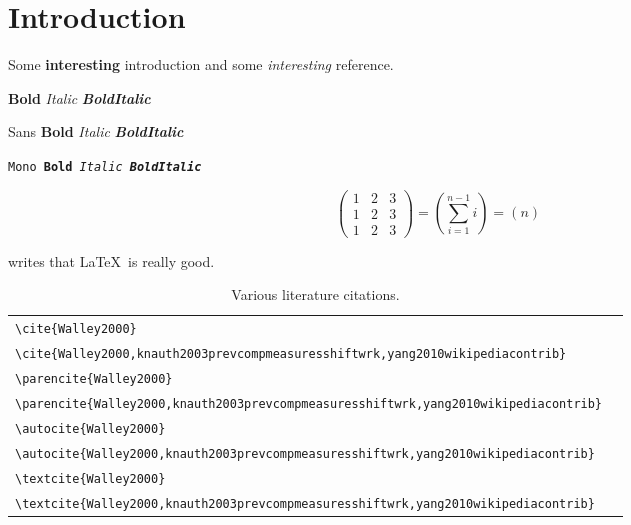 \chapter{Introduction}
\label{chap_introduction}

Some \textbf{interesting} \textsf{introduction} and some \emph{interesting} reference.
\par\textbf{Bold} \textit{Italic} \textbf{\textit{BoldItalic}}
\par\textsf{Sans \textbf{Bold} \textit{Italic} \textbf{\textit{BoldItalic}}}
\par\texttt{Mono \textbf{Bold} \textit{Italic} \textbf{\textit{BoldItalic}}}

\begin{equation*}
    \begin{pmatrix}
      1 & 2 & 3  \\
      1 & 2 & 3  \\
      1 & 2 & 3
    \end{pmatrix}
    = \left( \sum_{i=1}^{n-1} i \right)
    = \left( n \right)
\end{equation*}

\textcite{Walley2000} writes that \LaTeX\ is really good.

\begin{table}
\begin{tabular}{L{.6\linewidth}L{.3\linewidth}}%
\toprule%
\lstinline|\cite{Walley2000}| & \cite{Walley2000} \\[0.5em]%
\lstinline|\cite{Walley2000,knauth2003prevcompmeasuresshiftwrk,yang2010wikipediacontrib}| & \cite{Walley2000,knauth2003prevcompmeasuresshiftwrk,yang2010wikipediacontrib} \\
\midrule%
\lstinline|\parencite{Walley2000}| & \parencite{Walley2000} \\[0.5em]%
\lstinline|\parencite{Walley2000,knauth2003prevcompmeasuresshiftwrk,yang2010wikipediacontrib}| & \parencite{Walley2000,knauth2003prevcompmeasuresshiftwrk,yang2010wikipediacontrib} \\
\midrule%
\lstinline|\autocite{Walley2000}| & \autocite{Walley2000} \\[0.5em]%
\lstinline|\autocite{Walley2000,knauth2003prevcompmeasuresshiftwrk,yang2010wikipediacontrib}| & \autocite{Walley2000,knauth2003prevcompmeasuresshiftwrk,yang2010wikipediacontrib} \\
\midrule%
\lstinline|\textcite{Walley2000}| & \textcite{Walley2000} \\[0.5em]%
\lstinline|\textcite{Walley2000,knauth2003prevcompmeasuresshiftwrk,yang2010wikipediacontrib}| & \textcite{Walley2000,knauth2003prevcompmeasuresshiftwrk,yang2010wikipediacontrib} \\
\bottomrule%
\end{tabular}%
\caption{Various literature citations.}
\end{table}

